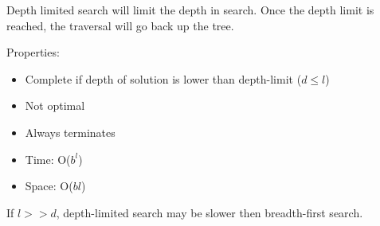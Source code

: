 \documentclass{article}
\begin{document}
Depth limited search will limit the depth in search. Once the depth limit is reached, the traversal will go back up the tree. 

Properties:
\begin{itemize}
    \item Complete if depth of solution is lower than depth-limit ($d \leq l$)
    \item Not optimal
    \item Always terminates
    \item Time: O($b^l$)
    \item Space: O($bl$)
\end{itemize}
If $l>>d$, depth-limited search may be slower then breadth-first search.
\printbibliography[title={Referências}]
\end{document}
